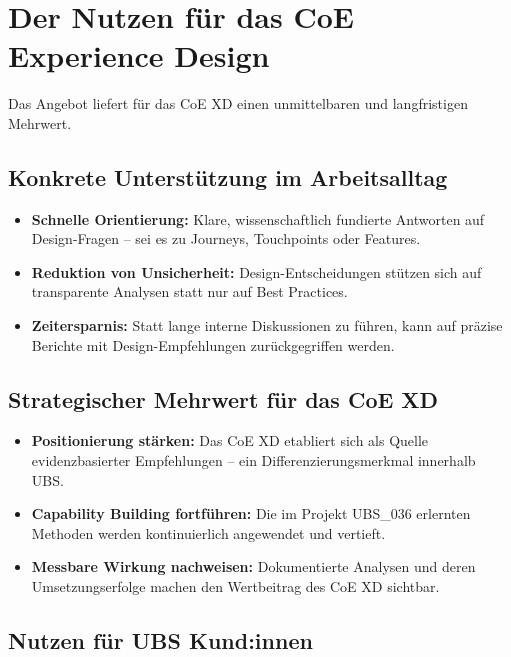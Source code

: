 \documentclass{fehradvice-report}
\begin{document}
\newpage
\section{Der Nutzen für das CoE Experience Design}

Das Angebot liefert für das CoE XD einen unmittelbaren und langfristigen Mehrwert.

\subsection{Konkrete Unterstützung im Arbeitsalltag}

\begin{itemize}
    \item[$\checkmark$] \textbf{Schnelle Orientierung:} Klare, wissenschaftlich fundierte Antworten auf Design-Fragen -- sei es zu Journeys, Touchpoints oder Features.
    \item[$\checkmark$] \textbf{Reduktion von Unsicherheit:} Design-Entscheidungen stützen sich auf transparente Analysen statt nur auf Best Practices.
    \item[$\checkmark$] \textbf{Zeitersparnis:} Statt lange interne Diskussionen zu führen, kann auf präzise Berichte mit Design-Empfehlungen zurückgegriffen werden.
\end{itemize}

\subsection{Strategischer Mehrwert für das CoE XD}

\begin{itemize}
    \item[$\checkmark$] \textbf{Positionierung stärken:} Das CoE XD etabliert sich als Quelle evidenzbasierter Empfehlungen -- ein Differenzierungsmerkmal innerhalb UBS.
    \item[$\checkmark$] \textbf{Capability Building fortführen:} Die im Projekt UBS\_036 erlernten Methoden werden kontinuierlich angewendet und vertieft.
    \item[$\checkmark$] \textbf{Messbare Wirkung nachweisen:} Dokumentierte Analysen und deren Umsetzungserfolge machen den Wertbeitrag des CoE XD sichtbar.
\end{itemize}

\subsection{Nutzen für UBS Kund:innen}
\end{document}
